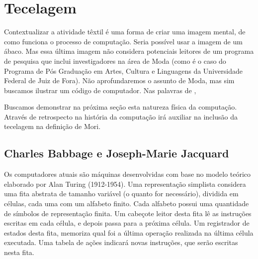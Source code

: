 \section{Tecelagem}\label{sec:tecelagem}

Contextualizar a atividade têxtil é uma forma de criar uma imagem mental, de como funciona o processo de computação. Seria possível usar a imagem de um ábaco. Mas essa última imagem não considera potenciais leitores de um programa de pesquisa que inclui investigadores na área de Moda (como é o caso do Programa de Pós Graduação em Artes, Cultura e Linguagens da Universidade Federal de Juiz de Fora). Não aprofundaremos o assunto de Moda, mas sim buscamos ilustrar um código de computador. Nas palavras de ,

\begin{citacao}
\end{citacao}

Buscamos demonstrar na próxima seção esta natureza física da computação. Através de retrospecto na história da computação irá auxiliar na inclusão da tecelagem na definição de Mori.

\subsection{Charles Babbage e Joseph-Marie Jacquard}

Os computadores atuais são máquinas desenvolvidas com base no modelo teórico elaborado por Alan Turing (1912-1954). Uma representação simplista considera uma fita abstrata de tamanho variável (o quanto for necessário), dividida em células, cada uma com um alfabeto finito. Cada alfabeto possui uma quantidade de símbolos de representação finita. Um cabeçote leitor desta fita lê as instruções escritas em cada célula, e depois passa para a próxima célula. Um registrador de estados desta fita, memoriza qual foi a última operação realizada na última célula executada. Uma tabela de ações indicará novas instruções, que serão escritas nesta fita.

